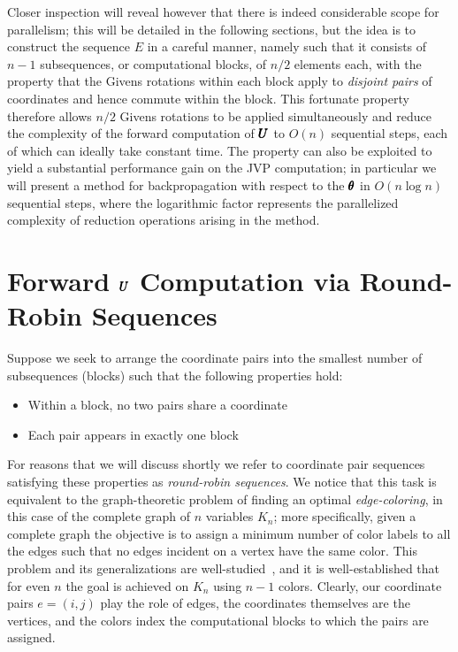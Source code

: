 \documentclass[superscriptaddress,floatfix]{article}
\begin{document}
Closer inspection will reveal however that there is indeed
considerable scope for parallelism; this will be detailed in the
following sections, but the idea is to construct the sequence $E$ in a
careful manner, namely such that it consists of $n-1$ subsequences, or
computational blocks, of $n/2$ elements each, with the property that
the Givens rotations within each block apply to \emph{disjoint pairs}
of coordinates and hence commute within the block. This fortunate
property therefore allows $n/2$ Givens rotations to be applied
simultaneously and reduce the complexity of the forward computation of
${\pmb{U}}$ to $O(n)$ sequential steps, each of which can ideally take
constant time. The property can also be exploited to yield a
substantial performance gain on the JVP computation; in particular we
will present a method for backpropagation with respect to the
${\pmb{\theta}}$ in $O(n\log n)$ sequential steps, where the logarithmic
factor represents the parallelized complexity of reduction operations
arising in the method.

\section{Forward ${\pmb{U}}$ Computation via Round-Robin Sequences}
\label{sec:ForwardU}

Suppose we seek to arrange the coordinate pairs into the smallest
number of subsequences (blocks) such that the following properties
hold:
\begin{itemize}
\item Within a block, no two pairs share a coordinate
\item Each pair appears in exactly one block
\end{itemize}
For reasons that we will discuss shortly we refer to coordinate pair
sequences satisfying these properties as \emph{round-robin
  sequences}. We notice that this task is equivalent to the
graph-theoretic problem of finding an optimal \emph{edge-coloring}, in
this case of the complete graph of $n$ variables $K_n$; more
specifically, given a complete graph the objective is to assign a
minimum number of color labels to all the edges such that no edges
incident on a vertex have the same color. This problem and its
generalizations are well-studied~\cite{baranyai1974factorization}, and
it is well-established that for even $n$ the goal is achieved on $K_n$
using $n-1$ colors. Clearly, our coordinate pairs $e = (i,j)$ play the
role of edges, the coordinates themselves are the vertices, and the
colors index the computational blocks to which the pairs are assigned.
\end{document}
